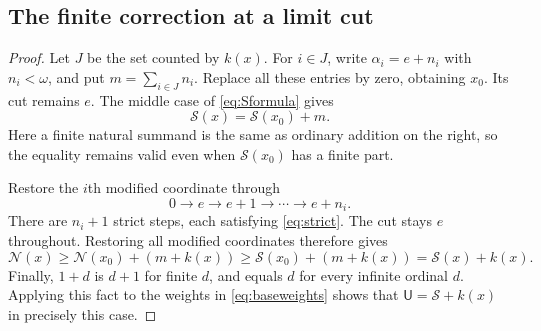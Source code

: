 \documentclass[11pt,a4paper]{article}
\newtheorem{lemma}[theorem]{Lemma}
\theoremstyle{definition}
\newcommand{\OpN}{\mathcal N}
\newcommand{\OpS}{\mathcal S}
\newcommand{\FunU}{\mathsf U}
\newcommand{\tail}{\varepsilon}
\newcommand{\prof}{\operatorname{prof}}
\begin{document}
\subsection{The finite correction at a limit cut}
\begin{proof}
Let $J$ be the set counted by $k(x)$. For $i\in J$, write
$\alpha_i=e+n_i$ with $n_i<\omega$, and put $m=\sum_{i\in J}n_i$.
Replace all these entries by zero, obtaining $x_0$. Its cut remains $e$.
The middle case of \eqref{eq:Sformula} gives
\[
 \OpS(x)=\OpS(x_0)+m.
\]
Here a finite natural summand is the same as ordinary addition on the right,
so the equality remains valid even when $\OpS(x_0)$ has a finite part.

Restore the $i$th modified coordinate through
\[
 0\longrightarrow e\longrightarrow e+1\longrightarrow\cdots
                         \longrightarrow e+n_i.
\]
There are $n_i+1$ strict steps, each satisfying \eqref{eq:strict}. The cut
stays $e$ throughout. Restoring all modified coordinates therefore gives
\[
 \OpN(x)\ge\OpN(x_0)+(m+k(x))
          \ge\OpS(x_0)+(m+k(x))=\OpS(x)+k(x).
\]
Finally, $1+d$ is $d+1$ for finite $d$, and equals $d$ for every infinite
ordinal $d$. Applying this fact to the weights in \eqref{eq:baseweights}
shows that $\FunU=\OpS+k(x)$ in precisely this case.
\end{proof}
\end{document}
